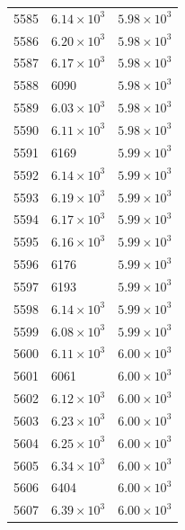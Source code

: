 \begin{table}[H]
\begin{tabular}{lll}
5585 & $\displaystyle 6.14 \times 10^{3}$ & $\displaystyle 5.98 \times 10^{3}$ \\
5586 & $\displaystyle 6.20 \times 10^{3}$ & $\displaystyle 5.98 \times 10^{3}$ \\
5587 & $\displaystyle 6.17 \times 10^{3}$ & $\displaystyle 5.98 \times 10^{3}$ \\
5588 & 6090 & $\displaystyle 5.98 \times 10^{3}$ \\
5589 & $\displaystyle 6.03 \times 10^{3}$ & $\displaystyle 5.98 \times 10^{3}$ \\
5590 & $\displaystyle 6.11 \times 10^{3}$ & $\displaystyle 5.98 \times 10^{3}$ \\
5591 & 6169 & $\displaystyle 5.99 \times 10^{3}$ \\
5592 & $\displaystyle 6.14 \times 10^{3}$ & $\displaystyle 5.99 \times 10^{3}$ \\
5593 & $\displaystyle 6.19 \times 10^{3}$ & $\displaystyle 5.99 \times 10^{3}$ \\
5594 & $\displaystyle 6.17 \times 10^{3}$ & $\displaystyle 5.99 \times 10^{3}$ \\
5595 & $\displaystyle 6.16 \times 10^{3}$ & $\displaystyle 5.99 \times 10^{3}$ \\
5596 & 6176 & $\displaystyle 5.99 \times 10^{3}$ \\
5597 & 6193 & $\displaystyle 5.99 \times 10^{3}$ \\
5598 & $\displaystyle 6.14 \times 10^{3}$ & $\displaystyle 5.99 \times 10^{3}$ \\
5599 & $\displaystyle 6.08 \times 10^{3}$ & $\displaystyle 5.99 \times 10^{3}$ \\
5600 & $\displaystyle 6.11 \times 10^{3}$ & $\displaystyle 6.00 \times 10^{3}$ \\
5601 & 6061 & $\displaystyle 6.00 \times 10^{3}$ \\
5602 & $\displaystyle 6.12 \times 10^{3}$ & $\displaystyle 6.00 \times 10^{3}$ \\
5603 & $\displaystyle 6.23 \times 10^{3}$ & $\displaystyle 6.00 \times 10^{3}$ \\
5604 & $\displaystyle 6.25 \times 10^{3}$ & $\displaystyle 6.00 \times 10^{3}$ \\
5605 & $\displaystyle 6.34 \times 10^{3}$ & $\displaystyle 6.00 \times 10^{3}$ \\
5606 & 6404 & $\displaystyle 6.00 \times 10^{3}$ \\
5607 & $\displaystyle 6.39 \times 10^{3}$ & $\displaystyle 6.00 \times 10^{3}$ \\

\end{tabular}
\end{table}
